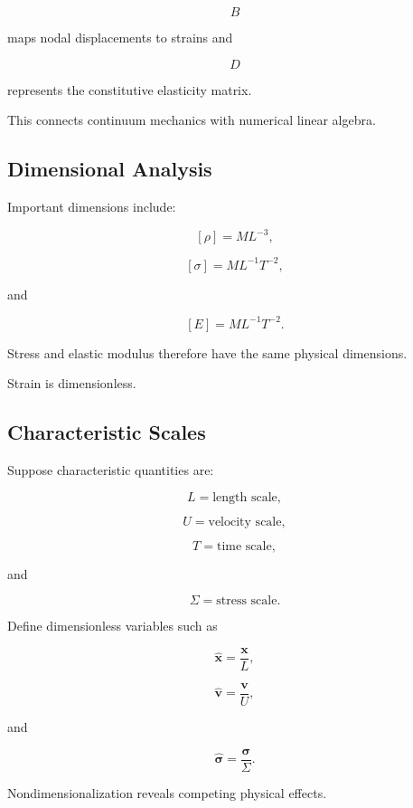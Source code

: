\[
B
\]

maps nodal displacements to strains and

\[
D
\]

represents the constitutive elasticity matrix.

This connects continuum mechanics with numerical linear algebra.

\subsection{Dimensional Analysis}
\label{subsec:continuum-dimensional-analysis}

Important dimensions include:

\[
[\rho]
=
ML^{-3},
\]

\[
[\sigma]
=
ML^{-1}T^{-2},
\]

and

\[
[E]
=
ML^{-1}T^{-2}.
\]

Stress and elastic modulus therefore have the same physical dimensions.

Strain is dimensionless.

\subsection{Characteristic Scales}
\label{subsec:continuum-characteristic-scales}

Suppose characteristic quantities are:

\[
L
=
\text{length scale},
\]

\[
U
=
\text{velocity scale},
\]

\[
T
=
\text{time scale},
\]

and

\[
\Sigma
=
\text{stress scale}.
\]

Define dimensionless variables such as

\[
\boxed{
\hat{\mathbf{x}}
=
\frac{\mathbf{x}}{L},
}
\]

\[
\boxed{
\hat{\mathbf{v}}
=
\frac{\mathbf{v}}{U},
}
\]

and

\[
\boxed{
\hat{\boldsymbol{\sigma}}
=
\frac{\boldsymbol{\sigma}}{\Sigma}.
}
\]

Nondimensionalization reveals competing physical effects.

